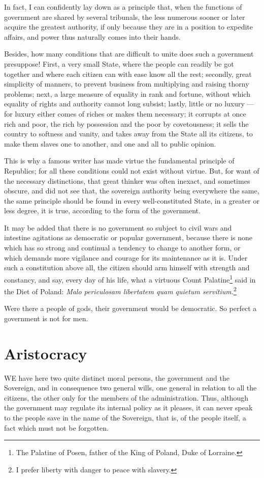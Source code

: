 \documentclass[12pt]{book}
\begin{document}
In fact, I can confidently lay down as a principle that, when the functions of government are shared by several tribunals, the less numerous sooner or later acquire the greatest authority, if only because they are in a position to expedite affairs, and power thus naturally comes into their hands.

Besides, how many conditions that are difficult to unite does such a government presuppose! First, a very small State, where the people can readily be got together and where each citizen can with ease know all the rest; secondly, great simplicity of manners, to prevent business from multiplying and raising thorny problems; next, a large measure of equality in rank and fortune, without which equality of rights and authority cannot long subsist; lastly, little or no luxury — for luxury either comes of riches or makes them necessary; it corrupts at once rich and poor, the rich by possession and the poor by covetousness; it sells the country to softness and vanity, and takes away from the State all its citizens, to make them slaves one to another, and one and all to public opinion.

This is why a famous writer has made virtue the fundamental principle of Republics; for all these conditions could not exist without virtue. But, for want of the necessary distinctions, that great thinker was often inexact, and sometimes obscure, and did not see that, the sovereign authority being everywhere the same, the same principle should be found in every well-constituted State, in a greater or less degree, it is true, according to the form of the government.

It may be added that there is no government so subject to civil wars and intestine agitations as democratic or popular government, because there is none which has so strong and continual a tendency to change to another form, or which demands more vigilance and courage for its maintenance as it is. Under such a constitution above all, the citizen should arm himself with strength and constancy, and say, every day of his life, what a virtuous Count Palatine\footnote{The Palatine of Posen, father of the King of Poland, Duke of Lorraine.} said in the Diet of Poland: \textit{Malo periculosam libertatem quam quietum servitium.}\footnote{I prefer liberty with danger to peace with slavery.}

Were there a people of gods, their government would be democratic. So perfect a government is not for men.

\section{Aristocracy}
WE have here two quite distinct moral persons, the government and the Sovereign, and in consequence two general wills, one general in relation to all the citizens, the other only for the members of the administration. Thus, although the government may regulate its internal policy as it pleases, it can never speak to the people save in the name of the Sovereign, that is, of the people itself, a fact which must not be forgotten.
\end{document}

